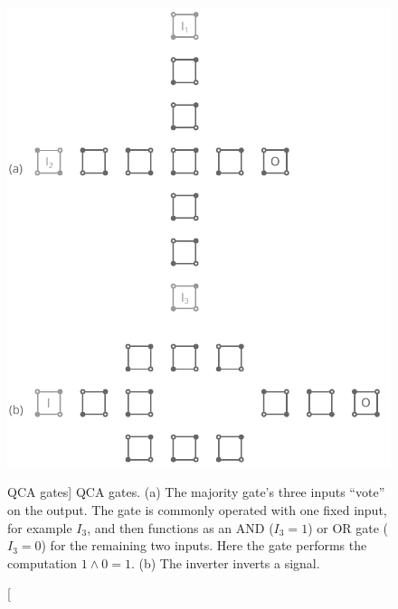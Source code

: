 %
\begin{figure}
  \center
  \includegraphics{gates}
  \caption
[QCA gates]
{
QCA gates. (a) The majority gate's three inputs ``vote'' on the output. The gate
is commonly operated with one fixed input, for example $I_3$, and then functions
as an AND ($I_3 = 1$) or OR gate ($I_3 = 0$) for the remaining two inputs. Here
the gate performs the computation $1 \land 0 = 1$. (b) The inverter inverts a
signal.
}
  \label{fig:gates}
\end{figure}

